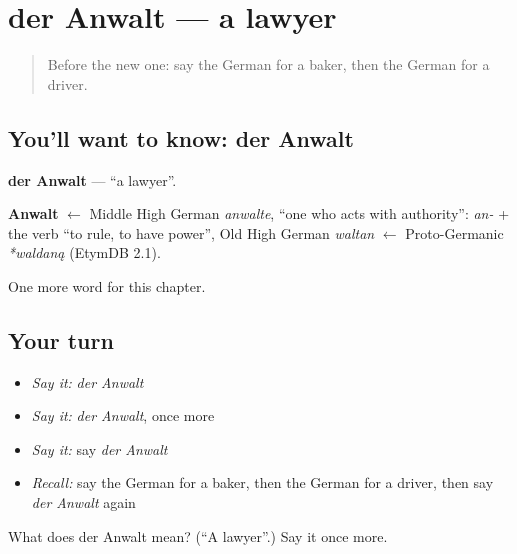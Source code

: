 \section[der Anwalt]{der Anwalt — a lawyer}

\label{lesson:GE-C125-anwalt}



\begin{quote}
Before the new one: say the German for a baker, then the German for a driver.
\end{quote}

\subsection*{You'll want to know: der Anwalt}
\textbf{der Anwalt} — \textquotedblleft{}a lawyer\textquotedblright{}.

\begin{cousinweb}
\textbf{Anwalt} $\leftarrow$ Middle High German \emph{anwalte}, \textquotedblleft{}one who acts with authority\textquotedblright{}: \emph{an-} + the verb \textquotedblleft{}to rule, to have power\textquotedblright{}, Old High German \emph{waltan} $\leftarrow$ Proto-Germanic \emph{*waldaną} (EtymDB 2.1).
\end{cousinweb}

\begin{grammarlens}[title={What you've built}]
One more word for this chapter.
\end{grammarlens}

\subsection*{Your turn}
\begin{itemize}
\raggedright
  \item \emph{Say it:} \emph{der Anwalt}
  \item \emph{Say it:} \emph{der Anwalt}, once more
  \item \emph{Say it:} say \emph{der Anwalt}
  \item \emph{Recall:} say the German for a baker, then the German for a driver, then say \emph{der Anwalt} again
\end{itemize}

\begin{tcolorbox}[breakable,colback=teal!4,colframe=teal!35!black,title={Before you move on}]
What does der Anwalt mean? (\textquotedblleft{}A lawyer\textquotedblright{}.) Say it once more.
\end{tcolorbox}
